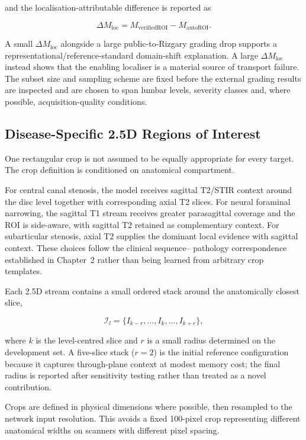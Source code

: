 and the localisation-attributable difference is reported as

\begin{equation}
\Delta M_{\mathrm{loc}}
=
M_{\mathrm{verifiedROI}}-M_{\mathrm{autoROI}}.
\label{eq:localisation-controlled-delta}
\end{equation}

A small $\Delta M_{\mathrm{loc}}$ alongside a large public-to-Rizgary grading
drop supports a representational/reference-standard domain-shift explanation.
A large $\Delta M_{\mathrm{loc}}$ instead shows that the enabling localiser is a
material source of transport failure. The subset size and sampling scheme are
fixed before the external grading results are inspected and are chosen to span
lumbar levels, severity classes and, where possible, acquisition-quality
conditions.

\subsection{Disease-Specific 2.5D Regions of Interest}
\label{sec:method-roi}

One rectangular crop is not assumed to be equally appropriate for every target.
The crop definition is conditioned on anatomical compartment.

For central canal stenosis, the model receives sagittal T2/STIR context around
the disc level together with corresponding axial T2 slices. For neural
foraminal narrowing, the sagittal T1 stream receives greater parasagittal
coverage and the ROI is side-aware, with sagittal T2 retained as complementary
context. For subarticular stenosis, axial T2 supplies the dominant local
evidence with sagittal context. These choices follow the clinical sequence--
pathology correspondence established in Chapter~2 rather than being learned
from arbitrary crop templates.

Each 2.5D stream contains a small ordered stack around the anatomically closest
slice,

\[
\mathcal{I}_l =
\{I_{k-r},\ldots,I_k,\ldots,I_{k+r}\},
\]

where $k$ is the level-centred slice and $r$ is a small radius determined on the
development set. A five-slice stack ($r=2$) is the initial reference
configuration because it captures through-plane context at modest memory cost;
the final radius is reported after sensitivity testing rather than treated as
a novel contribution.

Crops are defined in physical dimensions where possible, then resampled to the
network input resolution. This avoids a fixed 100-pixel crop representing
different anatomical widths on scanners with different pixel spacing.

